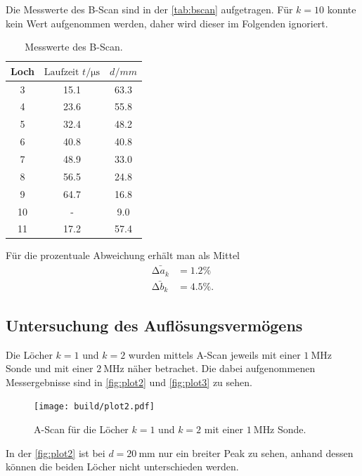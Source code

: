 Die Messwerte des B-Scan sind in der \autoref{tab:bscan} aufgetragen. Für $k =10$ konnte kein Wert aufgenommen werden, daher wird dieser
im Folgenden ignoriert.
\begin{table}[H]
    \centering
    \caption{Messwerte des B-Scan.}
    \label{tab:bscan}
\begin{tabular}{c c c}
\toprule
Loch & $\text{Laufzeit } t / \si{\micro\second} $& $ d/ \si{mm}$\\
\midrule
 3 & 15.1 & 63.3 \\
 4 & 23.6 & 55.8 \\
 5 & 32.4 & 48.2 \\
 6 & 40.8 & 40.8 \\
 7 & 48.9 & 33.0 \\
 8 & 56.5 & 24.8 \\
 9 & 64.7 & 16.8 \\
10 & - &  9.0 \\
11 & 17.2 & 57.4 \\
\bottomrule
\end{tabular}
\end{table}

Für die prozentuale Abweichung erhält man als Mittel
\begin{align*}
\bar{\increment a_k} &= 1.2 \% \\
\bar{\increment b_k} &= 4.5 \%.
\end{align*}


\subsection{Untersuchung des Auflösungsvermögens} %
\label{sec:Untersuchung des Auslösungsverfahrens}

Die Löcher $k = 1$ und $k = 2$ wurden mittels A-Scan jeweils mit einer $\SI{1}{\mega\hertz}$ Sonde und mit einer
$\SI{2}{\mega\hertz}$ näher betrachet. Die dabei aufgenommenen Messergebnisse sind in \autoref{fig:plot2} und \autoref{fig:plot3}
zu sehen.

\begin{figure}[H]
	\texttt{[image: build/plot2.pdf]}
	\captionsetup{width=0.765\linewidth}
	\caption{A-Scan für die Löcher $k = 1$ und $k = 2$ mit einer $\SI{1}{\mega\hertz}$ Sonde.}
	\label{fig:plot2}
\end{figure}
In der \autoref{fig:plot2} ist bei $d = \SI{20}{\milli\meter}$ nur ein breiter Peak zu sehen, anhand dessen können die beiden Löcher nicht unterschieden werden.


